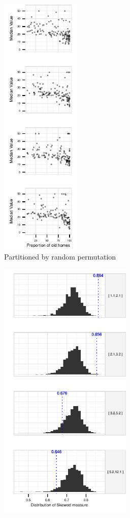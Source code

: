 \begin{figure}
\begin{subfigure}[t]{1.5in}
 	 \includegraphics[width=1.5in]{images/randCluster.pdf}
     \vspace{-0.37cm}
 	 \caption{Partitioned by random permutation}
	 \label{fig:method_random}
    \end{subfigure}
     \begin{subfigure}[t]{2.5in}
 	\includegraphics[width=2.5in]{images/hist-DIS.pdf}

\end{subfigure}
\end{figure}
